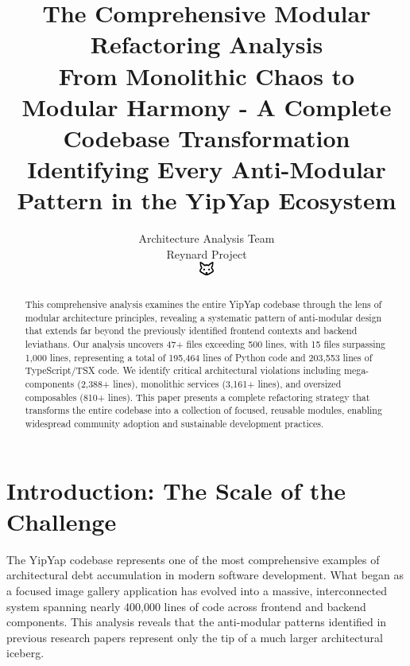 \documentclass[11pt]{article}
\begin{document}
\title{\textbf{The Comprehensive Modular Refactoring Analysis} \\
\Large{From Monolithic Chaos to Modular Harmony - A Complete Codebase Transformation} \\
\large{Identifying Every Anti-Modular Pattern in the YipYap Ecosystem}}

\author{Architecture Analysis Team\\
Reynard Project\\
\includegraphics[width=0.5cm]{../../shared-assets/favicon.pdf}}

\maketitle

\begin{abstract}
This comprehensive analysis examines the entire YipYap codebase through the lens of modular architecture principles, revealing a systematic pattern of anti-modular design that extends far beyond the previously identified frontend contexts and backend leviathans. Our analysis uncovers 47+ files exceeding 500 lines, with 15 files surpassing 1,000 lines, representing a total of 195,464 lines of Python code and 203,553 lines of TypeScript/TSX code. We identify critical architectural violations including mega-components (2,388+ lines), monolithic services (3,161+ lines), and oversized composables (810+ lines). This paper presents a complete refactoring strategy that transforms the entire codebase into a collection of focused, reusable modules, enabling widespread community adoption and sustainable development practices.
\end{abstract}

\tableofcontents
\newpage

\section{Introduction: The Scale of the Challenge}

The YipYap codebase represents one of the most comprehensive examples of architectural debt accumulation in modern software development. What began as a focused image gallery application has evolved into a massive, interconnected system spanning nearly 400,000 lines of code across frontend and backend components. This analysis reveals that the anti-modular patterns identified in previous research papers represent only the tip of a much larger architectural iceberg.
\end{document}
